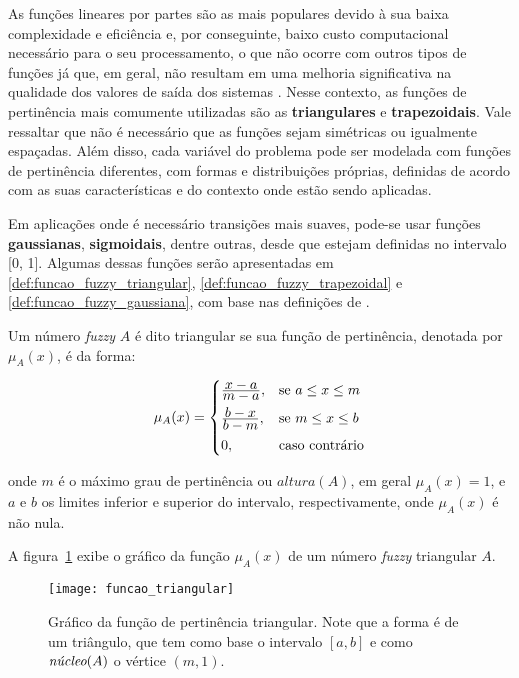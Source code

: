 As funções lineares por partes são as mais populares devido à sua baixa complexidade e eficiência e, por conseguinte, baixo custo computacional necessário para o seu processamento, o que não ocorre com outros tipos de funções já que, em geral, não resultam em uma melhoria significativa na qualidade dos valores de saída dos sistemas \citep{yen:99}. Nesse contexto, as funções de pertinência mais comumente utilizadas são as \textbf{triangulares} e \textbf{trapezoidais}. Vale ressaltar que não é necessário que as funções sejam simétricas ou igualmente  espaçadas. Além disso, cada variável do problema pode ser modelada com funções de pertinência diferentes,  com  formas  e  distribuições  próprias, definidas  de  acordo com  as suas características e do contexto onde estão sendo aplicadas.

Em aplicações onde é necessário transições mais suaves, pode-se usar funções \textbf{gaussianas}, \textbf{sigmoidais}, dentre outras, desde que estejam definidas no intervalo [0, 1]. Algumas dessas funções serão apresentadas em \ref{def:funcao_fuzzy_triangular}, \ref{def:funcao_fuzzy_trapezoidal} e \ref{def:funcao_fuzzy_gaussiana}, com base nas definições de \citet{sumathi:10}.

\begin{defn}
\label{def:funcao_fuzzy_triangular}
Um número \emph{fuzzy} $A$ é dito triangular se sua função de pertinência, denotada por $\mu_{A}(x)$, é da forma:

\begin{equation}
  \mu_A(x) =  \begin{cases}
                \frac{\displaystyle x - a}{\displaystyle m - a}, & \text{se}\ a \leq x \leq m\\[0.5em]
                \frac{\displaystyle b - x}{\displaystyle b - m}, & \text{se}\ m \leq x \leq b\\[0.5em]
                0, & \text{caso contrário}
              \end{cases}
\end{equation}
\end{defn}
\noindent onde $m$ é o máximo grau de pertinência ou $altura(A)$, em geral $\mu_A(x) = 1$, e $a$ e $b$ os limites inferior e superior do intervalo, respectivamente, onde $\mu_A(x)$ é não nula.

A figura~\ref{fig:funcao_fuzzy_triangular} exibe o gráfico da função $\mu_A(x)$ de um número \emph{fuzzy} triangular $A$.

\begin{figure}[!h]
  \centering
  \texttt{[image: funcao\_triangular]}
  \caption[Gráfico da função de pertinência triangular]{Gráfico da função de pertinência triangular. Note que a forma é de um triângulo, que tem como base o intervalo $[a, b]$ e como $\emph{núcleo}(A)$ o vértice $(m, 1)$.}
  \label{fig:funcao_fuzzy_triangular}
\end{figure}

